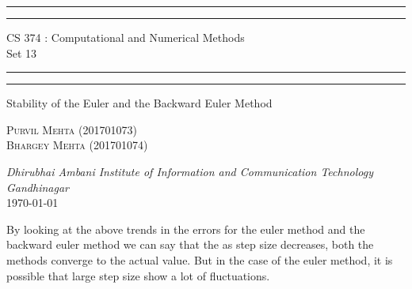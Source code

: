 \documentclass{article}
\begin{document}
\begin{titlepage}
	\centering 
	\scshape
	\vspace*{\baselineskip}
	\rule{\textwidth}{1.6pt}\vspace*{-\baselineskip}\vspace*{2pt}
	\rule{\textwidth}{0.4pt} 
	\vspace{0.75\baselineskip}
	
	{\Large CS 374 : Computational and Numerical Methods \\\vspace{0.75\baselineskip} Set 13}
	\vspace{0.75\baselineskip}
	
	\rule{\textwidth}{0.4pt}\vspace*{-\baselineskip}\vspace{3.2pt} 
	\rule{\textwidth}{1.6pt}
	
	\vspace{2\baselineskip}  
	Stability of the Euler and the Backward Euler Method
	
	\vspace*{3\baselineskip}
	
	\vspace{0.5\baselineskip} %
	
	{\scshape\large Purvil Mehta (201701073) \\ Bhargey Mehta (201701074) \\} 
	
	\vspace{1\baselineskip} 
	
	\textit{Dhirubhai Ambani Institute of Information and Communication Technology \\ Gandhinagar\\} 
	\vspace*{2\baselineskip}
	\today


\end{titlepage}
\newpage

\begin{table}[!h]
\end{table}

By looking at the above trends in the errors for the euler method and the backward euler method we can say that the as step size decreases, both the methods converge to the actual value. But in the case of the euler method, it is possible that large step size show a lot of fluctuations.
\end{document}
